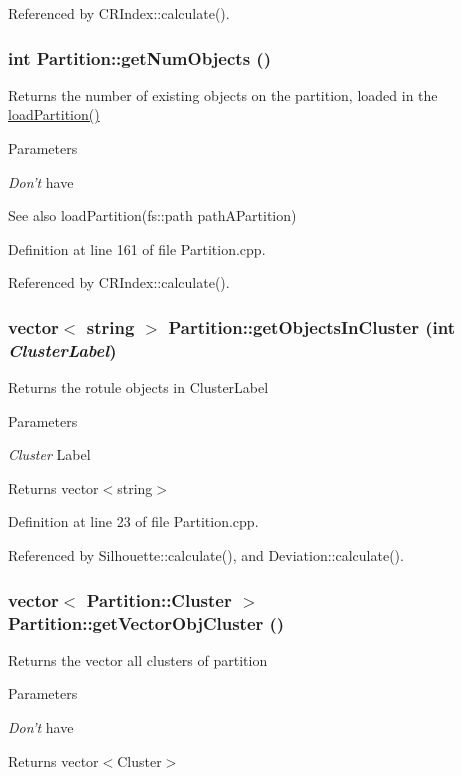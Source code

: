 Referenced by CRIndex::calculate().\hypertarget{classPartition_ae59c41688846ed426c0fba2338543440}{
\subsubsection[{getNumObjects}]{\setlength{\rightskip}{0pt plus 5cm}int Partition::getNumObjects ()}}
\label{classPartition_ae59c41688846ed426c0fba2338543440}
Returns the number of existing objects on the partition, loaded in the \hyperlink{classPartition_a025f8c250b2e7bb9d74ff18e6839105a}{loadPartition()} 
\begin{DoxyParams}{Parameters}
\item[{\em Don't}]have \end{DoxyParams}
\begin{DoxySeeAlso}{See also}
loadPartition(fs::path pathAPartition) 
\end{DoxySeeAlso}


Definition at line 161 of file Partition.cpp.

Referenced by CRIndex::calculate().\hypertarget{classPartition_a2e226fe3b809239ceded7aa471339f2d}{
\subsubsection[{getObjectsInCluster}]{\setlength{\rightskip}{0pt plus 5cm}vector$<$ string $>$ Partition::getObjectsInCluster (int {\em ClusterLabel})}}
\label{classPartition_a2e226fe3b809239ceded7aa471339f2d}
Returns the rotule objects in ClusterLabel 
\begin{DoxyParams}{Parameters}
\item[{\em Cluster}]Label \end{DoxyParams}
\begin{DoxyReturn}{Returns}
vector$<$string$>$ 
\end{DoxyReturn}


Definition at line 23 of file Partition.cpp.

Referenced by Silhouette::calculate(), and Deviation::calculate().\hypertarget{classPartition_a30c36aee050b5a222f70feae3a48ab07}{
\subsubsection[{getVectorObjCluster}]{\setlength{\rightskip}{0pt plus 5cm}vector$<$ Partition::Cluster $>$ Partition::getVectorObjCluster ()}}
\label{classPartition_a30c36aee050b5a222f70feae3a48ab07}
Returns the vector all clusters of partition 
\begin{DoxyParams}{Parameters}
\item[{\em Don't}]have \end{DoxyParams}
\begin{DoxyReturn}{Returns}
vector$<$Cluster$>$ 
\end{DoxyReturn}


